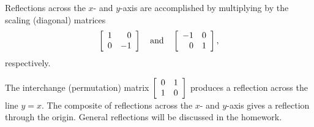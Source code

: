 \begin{multicols}{2}
Reflections across the $x$- and $y$-axis are accomplished by multiplying by the scaling (diagonal) matrices 
\[\mtx{rr}{1&0\\0&-1} \quad \text{and}\quad  \mtx{rr}{-1&0\\0&1},\] respectively.\columnbreak
\mbox{}\\
\begin{center}
\end{center}
\end{multicols}\vspace{-0.2 in}
\noindent The interchange (permutation) matrix $\mtx{rr}{0&1\\1&0}$ produces a reflection across the line $y=x$. The composite of reflections across the $x$- and $y$-axis gives a reflection through the origin. General reflections will be discussed in the homework. \\


